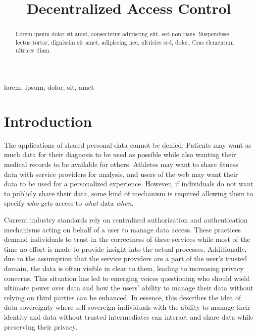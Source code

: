 \documentclass[conference]{IEEEtran}
\begin{document}
\title{Decentralized Access Control}%

\author{
}

\maketitle

\begin{abstract}
  Lorem ipsum dolor sit amet, consectetur adipiscing elit. sed non risus. Suspendisse lectus tortor, dignissim sit amet, adipiscing nec, ultricies sed, dolor. Cras elementum ultrices diam.
\end{abstract}

\begin{IEEEkeywords}
  lorem, ipsum, dolor, sit, amet
\end{IEEEkeywords}

\section{Introduction}
The applications of shared personal data cannot be denied.
Patients may want as much data for their diagnosis to be used as possible while also wanting their medical records to be available for others. \cite{hollis_share_2016}
Athletes may want to share fitness data with service providers for analysis, and users of the web may want their data to be used for a personalized experience.\cite{nasir_council_nodate}
However, if individuals do not want to publicly share their data, some kind of mechanism is required allowing them to specify \textit{who} gets access to \textit{what} data \textit{when}.

Current industry standards rely on centralized authorization and authentication mechanisms acting on behalf of a user to manage data access. \cite{hardt_oauth_2012,noauthor_googles_nodate}
These practices demand individuals to trust in the correctness of these services while most of the time no effort is made to provide insight into the actual processes.
Additionally, due to the assumption that the service providers are a part of the user's trusted domain, the data is often visible in clear to them, leading to increasing privacy concerns.
This situation has led to emerging voices questioning who should wield ultimate power over data and how the users' ability to manage their data without relying on third parties can be enhanced. \cite{noauthor_w3f_nodate}
In essence, this describes the idea of data sovereignty where self-sovereign individuals with the ability to manage their identity and data without trusted intermediates can interact and share data while preserving their privacy. \cite{ernstberger_sok_2023}
\end{document}
